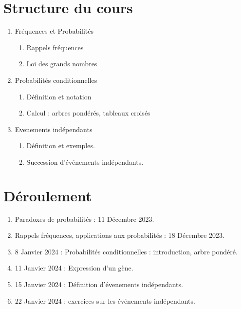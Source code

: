 \documentclass{article}
\begin{document}
\section{Structure du cours}
\begin{enumerate}
\item Fréquences et Probabilités
    \begin{enumerate}
    \item Rappels fréquences
    \item Loi des grands nombres
    \end{enumerate}
\item Probabilités conditionnelles
    \begin{enumerate}
    \item Définition et notation
    \item Calcul : arbres pondérés, tableaux croisés
    \end{enumerate}
\item Evenements indépendants
    \begin{enumerate}
    \item Définition et exemples.
    \item Succession d'événements indépendants.
    \end{enumerate}
\end{enumerate}
\section{Déroulement}
\begin{enumerate}
\item Paradoxes de probabilités : 11 Décembre 2023.
\item Rappels fréquences, applications aux probabilités : 18 Décembre 2023.
\item 8 Janvier 2024 : Probabilités conditionnelles : introduction, arbre pondéré.
\item 11 Janvier 2024 : Expression d'un gène.
\item 15 Janvier 2024 : Définition d'évenements indépendants.
\item 22 Janvier 2024 : exercices sur les événements indépendants.
\end{enumerate}
\end{document}

